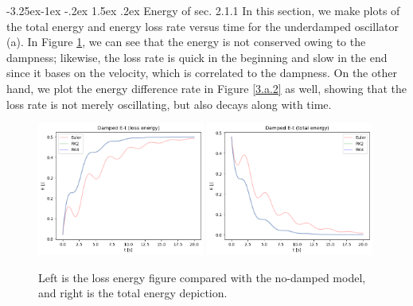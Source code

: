 \documentclass[12pt]{article}
\makeatletter
\renewcommand\subsection{\leftskip 0pt\@startsection{subsection}{2}{\z@}%
                                      {-3.25ex\@plus -1ex \@minus -.2ex}%
                                      {1.5ex \@plus .2ex}%
                                      {\normalfont\large\bfseries}}
\makeatother
\begin{document}
  \subsection{Energy of sec. 2.1.1}
  In this section, we make plots of the total energy and energy loss rate versus time for the underdamped oscillator (a). In Figure \ref{3.a.1}, we can see that the energy is not conserved owing to the dampness; likewise, the loss rate is quick in the beginning and slow in the end since it bases on the velocity, which is correlated to the dampness. On the other hand, we plot the energy difference rate in Figure \ref{3.a.2} as well, showing that the loss rate is not merely oscillating, but also decays along with time.
  \begin{figure}[H]
    \centering 
    \includegraphics[width = 0.49\textwidth]{damped_a_loss.png}
    \includegraphics[width = 0.49\textwidth]{damped_a_total.png}
    \caption{Left is the loss energy figure compared with the no-damped model, and right is the total energy depiction. \label{3.a.1}}
  \end{figure}
\end{document}
